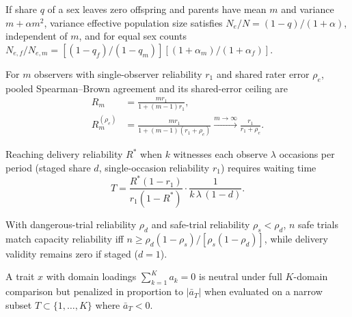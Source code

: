 \begin{proposition}\label{prop:ancestors}
If share $q$ of a sex leaves zero offspring and parents have mean $m$ and variance $m+\alpha m^2$, variance effective population size satisfies $N_e/N=(1-q)/(1+\alpha)$, independent of $m$, and for equal sex counts $N_{e,f}/N_{e,m}=[(1-q_f)/(1-q_m)][(1+\alpha_m)/(1+\alpha_f)]$.
\end{proposition}

For $m$ observers with single-observer reliability $r_1$ and shared rater error $\rho_e$, pooled Spearman--Brown agreement and its shared-error ceiling are
\begin{equation}
\begin{aligned}
R_m &= \frac{mr_1}{1+(m-1)r_1},\\
R_m^{(\rho_e)} &= \frac{mr_1}{1+(m-1)(r_1+\rho_e)}\xrightarrow{m\to\infty}\frac{r_1}{r_1+\rho_e}.
\end{aligned}\label{eq:sb}
\end{equation}

\begin{proposition}\label{prop:waiting}
Reaching delivery reliability $R^*$ when $k$ witnesses each observe $\lambda$ occasions per period (staged share $d$, single-occasion reliability $r_1$) requires waiting time
\begin{equation}
T=\frac{R^*(1-r_1)}{r_1(1-R^*)}\cdot\frac{1}{k\,\lambda\,(1-d)}.\label{eq:waiting}
\end{equation}
\end{proposition}

\begin{corollary}\label{cor:ritual}
With dangerous-trial reliability $\rho_d$ and safe-trial reliability $\rho_s<\rho_d$, $n$ safe trials match capacity reliability iff $n\ge\rho_d(1-\rho_s)/[\rho_s(1-\rho_d)]$, while delivery validity remains zero if staged ($d=1$).
\end{corollary}

\begin{corollary}\label{cor:narrow}
A trait $x$ with domain loadings $\sum_{k=1}^K a_k=0$ is neutral under full $K$-domain comparison but penalized in proportion to $|\bar a_T|$ when evaluated on a narrow subset $T\subset\{1,\dots,K\}$ where $\bar a_T<0$.
\end{corollary}

